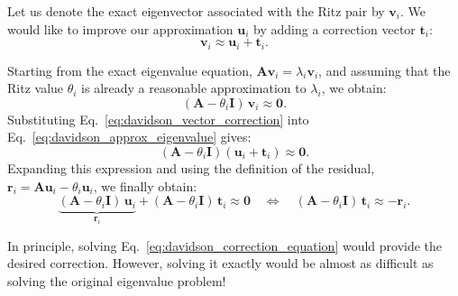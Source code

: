 \documentclass[10pt,aspectratio=169]{beamer}
\begin{document}
\begin{frame}
	Let us denote the exact eigenvector associated with the Ritz pair by $\mathbf v_i$. We would like to improve our approximation $\mathbf u_i$ by adding a correction vector $\mathbf t_i$:
	\begin{equation}
		\mathbf v_i\approx\mathbf u_i+\mathbf t_i.
		\label{eq:davidson_vector_correction}
	\end{equation}
	
	Starting from the exact eigenvalue equation, $\mathbf A\mathbf v_i=\lambda_i\mathbf v_i$, and assuming that the Ritz value $\theta_i$ is already a reasonable approximation to $\lambda_i$, we obtain:
	\begin{equation}
		(\mathbf A-\theta_i\mathbf I)\,\mathbf v_i\approx\mathbf 0.
		\label{eq:davidson_approx_eigenvalue}
	\end{equation}
	\pause
	Substituting Eq.~\eqref{eq:davidson_vector_correction} into Eq.~\eqref{eq:davidson_approx_eigenvalue} gives:
	\begin{equation*}
		(\mathbf A-\theta_i\mathbf I)(\mathbf u_i+\mathbf t_i)\approx\mathbf 0.
	\end{equation*}
	\pause
	Expanding this expression and using the definition of the residual, $\mathbf r_i=\mathbf A\mathbf u_i-\theta_i\mathbf u_i$, we finally obtain:
	\begin{equation}
		\underbrace{(\mathbf A-\theta_i\mathbf I)\,\mathbf u_i}_{\mathbf r_i}+(\mathbf A-\theta_i\mathbf I)\,\mathbf t_i\approx\mathbf 0
		\quad\Longleftrightarrow\quad
		(\mathbf A-\theta_i\mathbf I)\,\mathbf t_i\approx-\mathbf r_i.
		\label{eq:davidson_correction_equation}
	\end{equation}
	
	\medskip
	In principle, solving Eq.~\eqref{eq:davidson_correction_equation} would provide the desired correction. However, solving it exactly would be almost as difficult as solving the original eigenvalue problem!
\end{frame}
\end{document}
